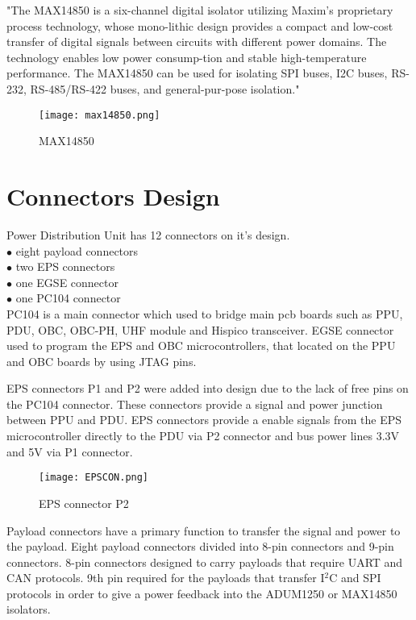 \cite{31} "The  MAX14850  is  a  six-channel  digital  isolator  utilizing  Maxim’s  proprietary  process  technology,  whose  mono-lithic  design  provides  a  compact  and  low-cost  transfer  of  digital  signals  between  circuits  with  different  power  domains.  The  technology  enables  low  power  consump-tion and stable high-temperature performance. The MAX14850 can be used for isolating SPI buses, I2C buses, RS-232, RS-485/RS-422 buses, and general-pur-pose isolation."

\begin{figure}[h]
	\centering
	\texttt{[image: max14850.png]}
	\caption{MAX14850}
	\label{fig: adum}
\end{figure} 

\section{Connectors Design}

Power Distribution Unit has 12 connectors on it's design. \\

$\bullet$ eight payload connectors\\
$\bullet$ two EPS connectors\\
$\bullet$ one EGSE connector\\
$\bullet$ one PC104 connector\\

PC104 is a main connector which used to bridge main pcb boards such as PPU, PDU, OBC, OBC-PH, UHF module and Hispico transceiver.
EGSE connector used to program the EPS and OBC microcontrollers, that located on the PPU and OBC boards by using JTAG pins.

EPS connectors P1 and P2 were added into design due to the lack of free pins on the PC104 connector. These connectors provide a signal and power junction between PPU and PDU. EPS connectors provide a enable signals from the EPS microcontroller directly to the PDU via P2 connector and bus power lines 3.3V and 5V via P1 connector.

  \begin{figure}[h]
  	\centering
  	\texttt{[image: EPSCON.png]}
  	\caption{EPS connector P2}
  	\label{fig: EPSCON}
  \end{figure} 

Payload connectors have a primary function to transfer the signal and power to the payload. Eight payload connectors divided into 8-pin connectors and 9-pin connectors. 8-pin connectors designed to carry payloads that require UART and CAN protocols. 9th pin required for the payloads that transfer I$^2$C and SPI protocols in order to give a power feedback into the ADUM1250 or MAX14850 isolators.  

